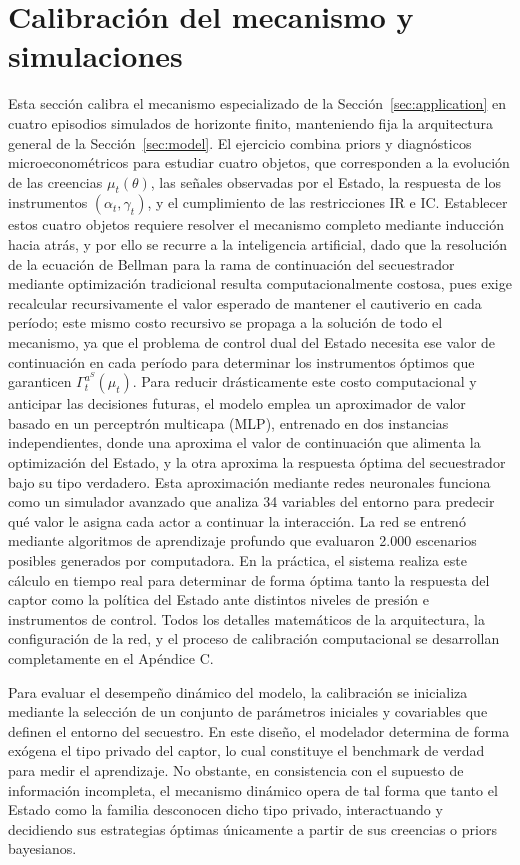 \documentclass[review,authoryear,12pt]{elsarticle}
\theoremstyle{plain}
\theoremstyle{definition}
\newcommand{\1}{\mathbf{1}}
\begin{document}
\section{Calibración del mecanismo y simulaciones}\label{sec:calibracion}
\normalfont\normalsize
Esta sección calibra el mecanismo especializado de la Sección~\ref{sec:application} en cuatro episodios simulados de horizonte finito, manteniendo fija la arquitectura general de la Sección~\ref{sec:model}. El ejercicio combina priors y diagnósticos microeconométricos para estudiar cuatro objetos, que corresponden a la evolución de las creencias $\mu_t(\theta)$, las señales observadas por el Estado, la respuesta de los instrumentos $(\alpha_t,\gamma_t)$, y el cumplimiento de las restricciones IR e IC. Establecer estos cuatro objetos requiere resolver el mecanismo completo mediante inducción hacia atrás, y por ello se recurre a la inteligencia artificial, dado que la resolución de la ecuación de Bellman para la rama de continuación del secuestrador mediante optimización tradicional resulta computacionalmente costosa, pues exige recalcular recursivamente el valor esperado de mantener el cautiverio en cada período; este mismo costo recursivo se propaga a la solución de todo el mecanismo, ya que el problema de control dual del Estado necesita ese valor de continuación en cada período para determinar los instrumentos óptimos que garanticen $\Gamma_t^{a^S}(\mu_t)$. Para reducir drásticamente este costo computacional y anticipar las decisiones futuras, el modelo emplea un aproximador de valor basado en un perceptrón multicapa (MLP), entrenado en dos instancias independientes, donde una aproxima el valor de continuación que alimenta la optimización del Estado, y la otra aproxima la respuesta óptima del secuestrador bajo su tipo verdadero. Esta aproximación mediante redes neuronales funciona como un simulador avanzado que analiza 34 variables del entorno para predecir qué valor le asigna cada actor a continuar la interacción. La red se entrenó mediante algoritmos de aprendizaje profundo que evaluaron 2.000 escenarios posibles generados por computadora. En la práctica, el sistema realiza este cálculo en tiempo real para determinar de forma óptima tanto la respuesta del captor como la política del Estado ante distintos niveles de presión e instrumentos de control. Todos los detalles matemáticos de la arquitectura, la configuración de la red, y el proceso de calibración computacional se desarrollan completamente en el Apéndice C.

Para evaluar el desempeño dinámico del modelo, la calibración se inicializa mediante la selección de un conjunto de parámetros iniciales y covariables que definen el entorno del secuestro. En este diseño, el modelador determina de forma exógena el tipo privado del captor, lo cual constituye el benchmark de verdad para medir el aprendizaje. No obstante, en consistencia con el supuesto de información incompleta, el mecanismo dinámico opera de tal forma que tanto el Estado como la familia desconocen dicho tipo privado, interactuando y decidiendo sus estrategias óptimas únicamente a partir de sus creencias o priors bayesianos.
\end{document}

